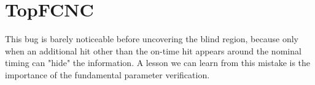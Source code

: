 
\chapter{TopFCNC} %

\label{AppendixB} %

% 
%

This bug is barely noticeable before uncovering the blind region, because only when an additional hit other than the on-time hit appears around the nominal timing can "hide" the information. A lesson we can learn from this mistake is the importance of the fundamental parameter verification.